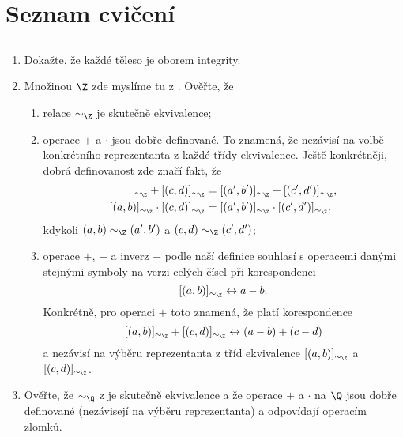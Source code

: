 \chapter*{Seznam cvičení}

\section*{}

\begin{enumerate}
 \item Dokažte, že každé těleso je oborem integrity.
 \item Množinou $\Z$ zde myslíme tu z . Ověřte,
  že
  \begin{enumerate}
  \item relace $ \sim _{\Z}$ je skutečně ekvivalence;
  \item operace $+$ a $ \cdot $ jsou dobře definované. To znamená, že nezávisí
   na volbě konkrétního reprezentanta z každé třídy ekvivalence. Ještě
   konkrétněji, dobrá definovanost zde značí fakt, že
   \begin{align*}
    [(a,b)]_{ \sim_{\Z}} + [(c,d)]_{ \sim _{\Z}} &= [(a',b')]_{ \sim _{\Z}} +
    [(c',d')]_{ \sim _{\Z}},\\
    [(a,b)]_{ \sim_{\Z}} \cdot [(c,d)]_{ \sim _{\Z}} &= [(a',b')]_{ \sim _{\Z}}
    \cdot [(c',d')]_{ \sim _{\Z}},
   \end{align*}
   kdykoli $(a,b) \sim _{\Z} (a',b')$ a $(c,d) \sim _{\Z} (c',d')$;
  \item operace $+$, $-$ a inverz $-$ podle naší definice souhlasí s operacemi
   danými stejnými symboly na  verzi celých čísel při korespondenci
   \[
    [(a,b)]_{ \sim_{\Z}} \leftrightarrow a - b.
   \]
   Konkrétně, pro operaci $+$ toto znamená, že platí korespondence
   \[
    [(a,b)]_{ \sim_{\Z}} + [(c,d)]_{ \sim _{\Z}} \leftrightarrow (a - b) + (c -
    d)
   \]
   a nezávisí na výběru reprezentanta z tříd ekvivalence $[(a,b)]_{ \sim _{\Z}}$
   a $[(c,d)]_{ \sim_{\Z}}$.
 \end{enumerate}
 \item Ověřte, že $ \sim _{\Q}$ z  je
  skutečně ekvivalence a že operace $+$ a $ \cdot $ na $\Q$ jsou dobře
  definované (nezávisejí na výběru reprezentanta) a odpovídají 
  operacím zlomků.
\end{enumerate}

